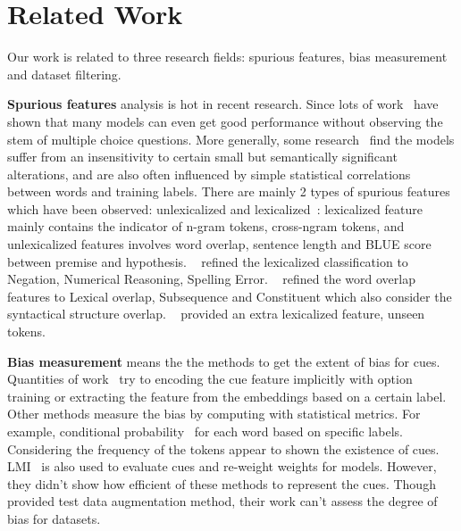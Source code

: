 \section{Related Work}
\label{sec:related}

Our work is related to three research fields: spurious features, bias measurement and dataset filtering.
 
\textbf{Spurious features} analysis is hot in recent research. Since 
lots of work~\cite{sharma2018tackling,srinivasan2018simple,zellers2018swag} 
have shown that many models can even 
get good performance without observing the stem of  multiple choice questions.
More generally, some research~\cite{sanchez2018behavior} find the models suffer
from an insensitivity to certain small but semantically significant alterations, and are also
often influenced by simple statistical correlations between words and training labels. 
There are mainly 2 types of spurious features which have been observed: 
 unlexicalized and  lexicalized~\cite{bowman2015large}:
lexicalized feature mainly contains the indicator of n-gram tokens, cross-ngram tokens, 
and unlexicalized features involves word overlap, sentence length and BLUE score between 
premise and hypothesis. ~\citealp{naik2018stress} refined the lexicalized classification to Negation, Numerical Reasoning, 
Spelling Error. ~\citealp{mccoy2019right} refined the word overlap 
features to Lexical overlap, Subsequence and Constituent 
which also consider the syntactical structure overlap. ~\citealp{sanchez2018behavior} 
provided an extra lexicalized feature, unseen tokens. 

\textbf{Bias measurement} means the the methods to get the extent of bias for cues. 
Quantities of work~\cite{clark2019don,he2019unlearn,yaghoobzadeh2019robust} 
try to encoding the cue feature implicitly with
option training or extracting the feature from the embeddings based on a certain label. 
Other methods measure the bias by computing with statistical metrics. For example, conditional
 probability~\cite{yu2020reclor} for each word based on specific labels. Considering the frequency of 
 the tokens appear to shown the existence of cues. LMI~\cite{schuster2019towards} is 
 also used to evaluate cues and re-weight weights for models. However, they didn't show 
 how efficient of these methods to represent the cues. Though~\citealp{Marco2020acl} provided test data 
 augmentation method, their work can't assess the degree of bias for datasets.
 
